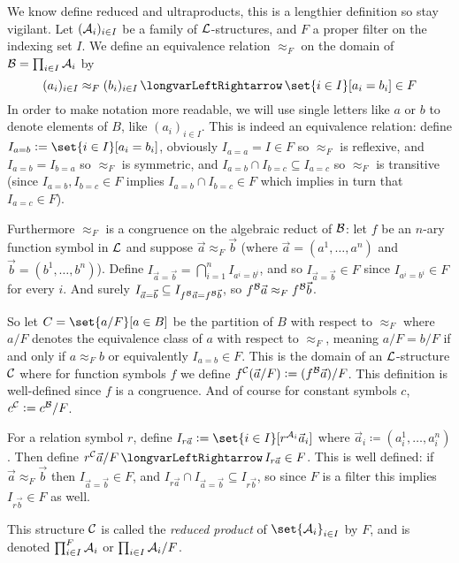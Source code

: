 We know define reduced and ultraproducts, this is a lengthier definition so stay vigilant.
Let $({\cal A}_i)_{i\in I}$ be a family of ${\cal L}$-structures, and $F$ a proper filter on the indexing set $I$.
We define an equivalence relation $\approx_F$ on the domain of ${\cal B}=\prod_{i\in I}{\cal A}_i$ by
$$ (a_i)_{i\in I}\approx_F(b_i)_{i\in I}\iff\set{i\in I}[a_i=b_i]\in F $$
In order to make notation more readable, we will use single letters like $a$ or $b$ to denote elements of $B$, like $(a_i)_{i\in I}$.
This is indeed an equivalence relation: define $I_{a=b}\coloneqq\set{i\in I}[a_i=b_i]$, obviously $I_{a=a}=I\in F$ so $\approx_F$ is reflexive, and $I_{a=b}=I_{b=a}$ so $\approx_F$ is symmetric, and
$I_{a=b}\cap I_{b=c}\subseteq I_{a=c}$ so $\approx_F$ is transitive (since $I_{a=b},I_{b=c}\in F$ implies $I_{a=b}\cap I_{b=c}\in F$ which implies in turn that $I_{a=c}\in F$).

Furthermore $\approx_F$ is a congruence on the algebraic reduct of ${\cal B}$: let $f$ be an $n$-ary function symbol in ${\cal L}$ and suppose $\vec a\approx_F\vec b$ (where $\vec a=(a^1,\dots,a^n)$ and
$\vec b=(b^1,\dots,b^n)$).
Define $I_{\vec a=\vec b}=\bigcap_{i=1}^n I_{a^i=b^i}$, and so $I_{\vec a=\vec b}\in F$ since $I_{a^i=b^i}\in F$ for every $i$.
And surely $I_{\vec a=\vec b}\subseteq I_{f^{\cal B}\vec a=f^{\cal B}\vec b}$, so $f^{\cal B}\vec a\approx_Ff^{\cal B}\vec b$.

So let $C=\set{a/F}[a\in B]$ be the partition of $B$ with respect to $\approx_F$ where $a/F$ denotes the equivalence class of $a$ with respect to $\approx_F$, meaning $a/F=b/F$ if and only if $a\approx_Fb$
or equivalently $I_{a=b}\in F$.
This is the domain of an ${\cal L}$-structure ${\cal C}$ where for function symbols $f$ we define $f^{\cal C}(\vec a/F)\coloneqq(f^{\cal B}\vec a)/F$.
This definition is well-defined since $f$ is a congruence.
And of course for constant symbols $c$, $c^{\cal C}\coloneqq c^{\cal B}/F$.

For a relation symbol $r$, define $I_{r\vec a}\coloneqq\set{i\in I}[r^{{\cal A}_i}\vec a_i]$ where $\vec a_i\coloneqq(a_i^1,\dots,a_i^n)$.
Then define $r^{\cal C}\vec a/F\iff I_{r\vec a}\in F$.
This is well defined: if $\vec a\approx_F\vec b$ then $I_{\vec a=\vec b}\in F$, and $I_{r\vec a}\cap I_{\vec a=\vec b}\subseteq I_{r\vec b}$, so since $F$ is a filter this implies $I_{r\vec b}\in F$ as well.

This structure ${\cal C}$ is called the {\it reduced product} of $\set{{\cal A}_i}_{i\in I}$ by $F$, and is denoted $\prod_{i\in I}^F{\cal A}_i$ or $\prod_{i\in I}{\cal A}_i/F$.

